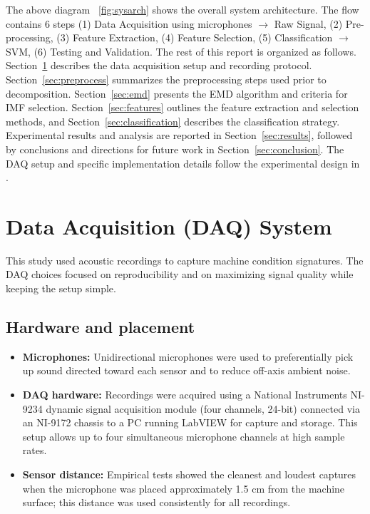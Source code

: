 \documentclass[12pt,a4paper]{article}
\begin{document}
\begin{multicols}{2}

The above diagram ~\ref{fig:sysarch} shows the overall system architecture. The flow contains 6 steps (1) Data Acquisition using microphones $\rightarrow$ Raw Signal, (2) Pre-processing, (3) Feature Extraction, (4) Feature Selection, (5) Classification $\rightarrow$ SVM, (6) Testing and Validation.
The rest of this report is organized as follows. Section~\ref{sec:daq} describes the data acquisition setup and recording protocol. Section~\ref{sec:preprocess} summarizes the preprocessing steps used prior to decomposition. Section~\ref{sec:emd} presents the EMD algorithm and criteria for IMF selection. Section~\ref{sec:features} outlines the feature extraction and selection methods, and Section~\ref{sec:classification} describes the classification strategy. Experimental results and analysis are reported in Section~\ref{sec:results}, followed by conclusions and directions for future work in Section~\ref{sec:conclusion}. The DAQ setup and specific implementation details follow the experimental design in \cite{Verma2016}.

\section{Data Acquisition (DAQ) System}
\label{sec:daq}

This study used acoustic recordings to capture machine condition signatures. The DAQ choices focused on reproducibility and on maximizing signal quality while keeping the setup simple.

\subsection{Hardware and placement}
\begin{itemize}
  \item \textbf{Microphones:} Unidirectional microphones were used to preferentially pick up sound directed toward each sensor and to reduce off-axis ambient noise.
  \item \textbf{DAQ hardware:} Recordings were acquired using a National Instruments NI-9234 dynamic signal acquisition module (four channels, 24-bit) connected via an NI-9172 chassis to a PC running LabVIEW for capture and storage. This setup allows up to four simultaneous microphone channels at high sample rates.
  \item \textbf{Sensor distance:} Empirical tests showed the cleanest and loudest captures when the microphone was placed approximately 1.5 cm from the machine surface; this distance was used consistently for all recordings.
\end{itemize}

\end{multicols}
\end{document}
